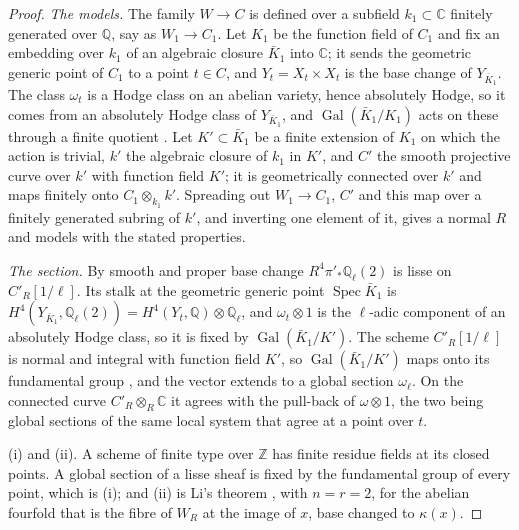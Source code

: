 \documentclass[11pt,reqno]{amsart}
\theoremstyle{plain}
\theoremstyle{definition}
\theoremstyle{remark}
\newcommand{\QQ}{\mathbb{Q}}
\newcommand{\ZZ}{\mathbb{Z}}
\newcommand{\CC}{\mathbb{C}}
\DeclareMathOperator{\Gal}{Gal}
\DeclareMathOperator{\Spec}{Spec}
\begin{document}
\begin{proof}
\emph{The models.} The family $W\to C$ is defined over a subfield
$k_{1}\subset\CC$ finitely generated over $\QQ$, say as $W_{1}\to C_{1}$. Let
$K_{1}$ be the function field of $C_{1}$ and fix an embedding over $k_{1}$ of
an algebraic closure $\bar{K}_{1}$ into $\CC$; it sends the geometric generic
point of $C_{1}$ to a point $t\in C$, and $Y_{t}=X_{t}\times X_{t}$ is the base
change of $Y_{\bar{K}_{1}}$. The class $\omega_{t}$ is a Hodge class on an
abelian variety, hence absolutely Hodge, so it comes from an absolutely Hodge
class of $Y_{\bar{K}_{1}}$, and $\Gal(\bar{K}_{1}/K_{1})$ acts on these
through a finite quotient \cite[Theorem~2.11 and Proposition~2.9]{Del82}. Let
$K'\subset\bar{K}_{1}$ be a finite extension of $K_{1}$ on which the action is
trivial, $k'$ the algebraic closure of $k_{1}$ in $K'$, and $C'$ the smooth
projective curve over $k'$ with function field $K'$; it is geometrically
connected over $k'$ and maps finitely onto $C_{1}\otimes_{k_{1}}k'$.
Spreading out $W_{1}\to C_{1}$, $C'$ and this map over a finitely generated
subring of $k'$, and inverting one element of it, gives a normal $R$ and
models with the stated properties.

\emph{The section.} By smooth and proper base change
$R^{4}\pi'_{*}\QQ_{\ell}(2)$ is lisse on $C'_{R}[1/\ell]$. Its stalk at the
geometric generic point $\Spec\bar{K}_{1}$ is $H^{4}(Y_{\bar{K}_{1}},
\QQ_{\ell}(2))=H^{4}(Y_{t},\QQ)\otimes\QQ_{\ell}$, and $\omega_{t}\otimes1$
is the $\ell$-adic component of an absolutely Hodge class, so it is fixed by
$\Gal(\bar{K}_{1}/K')$. The scheme $C'_{R}[1/\ell]$ is normal and integral
with function field $K'$, so $\Gal(\bar{K}_{1}/K')$ maps onto its fundamental
group \cite[Tag~0BQI]{Stacks}, and the vector extends to a global section
$\omega_{\ell}$. On the connected curve $C'_{R}\otimes_{R}\CC$ it agrees with
the pull-back of $\omega\otimes1$, the two being global sections of the same
local system that agree at a point over $t$.

(i) and (ii). A scheme of finite type over $\ZZ$ has finite residue fields at
its closed points. A global section of a lisse sheaf is fixed by the
fundamental group of every point, which is (i); and (ii) is Li's theorem
\cite[Theorem~1.1]{Li26}, with $n=r=2$, for the abelian fourfold that is the
fibre of $W_{R}$ at the image of $x$, base changed to $\kappa(x)$.


\end{proof}
\end{document}
